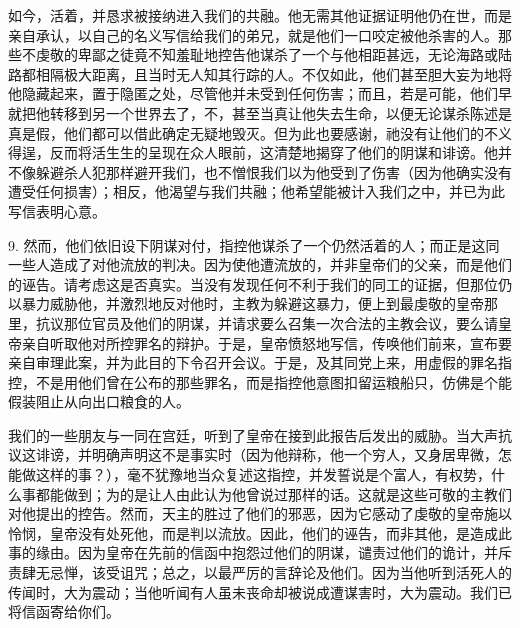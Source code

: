 如今，活着，并恳求被接纳进入我们的共融。他无需其他证据证明他仍在世，而是亲自承认，以自己的名义写信给我们的弟兄，就是他们一口咬定被他杀害的人。那些不虔敬的卑鄙之徒竟不知羞耻地控告他谋杀了一个与他相距甚远，无论海路或陆路都相隔极大距离，且当时无人知其行踪的人。不仅如此，他们甚至胆大妄为地将他隐藏起来，置于隐匿之处，尽管他并未受到任何伤害；而且，若是可能，他们早就把他转移到另一个世界去了，不，甚至当真让他失去生命，以便无论谋杀陈述是真是假，他们都可以借此确定无疑地毁灭。但为此也要感谢，祂没有让他们的不义得逞，反而将活生生的呈现在众人眼前，这清楚地揭穿了他们的阴谋和诽谤。他并不像躲避杀人犯那样避开我们，也不憎恨我们以为他受到了伤害（因为他确实没有遭受任何损害）；相反，他渴望与我们共融；他希望能被计入我们之中，并已为此写信表明心意。\par

9. 然而，他们依旧设下阴谋对付，指控他谋杀了一个仍然活着的人；而正是这同一些人造成了对他流放的判决。因为使他遭流放的，并非皇帝们的父亲，而是他们的诬告。请考虑这是否真实。当没有发现任何不利于我们的同工的证据，但那位仍以暴力威胁他，并激烈地反对他时，主教为躲避这暴力，便上到最虔敬的皇帝那里，抗议那位官员及他们的阴谋，并请求要么召集一次合法的主教会议，要么请皇帝亲自听取他对所控罪名的辩护。于是，皇帝愤怒地写信，传唤他们前来，宣布要亲自审理此案，并为此目的下令召开会议。于是，及其同党上来，用虚假的罪名指控，不是用他们曾在公布的那些罪名，而是指控他意图扣留运粮船只，仿佛是个能假装阻止从向出口粮食的人。\par

我们的一些朋友与一同在宫廷，听到了皇帝在接到此报告后发出的威胁。当大声抗议这诽谤，并明确声明这不是事实时（因为他辩称，他一个穷人，又身居卑微，怎能做这样的事？），毫不犹豫地当众复述这指控，并发誓说是个富人，有权势，什么事都能做到；为的是让人由此认为他曾说过那样的话。这就是这些可敬的主教们对他提出的控告。然而，天主的胜过了他们的邪恶，因为它感动了虔敬的皇帝施以怜悯，皇帝没有处死他，而是判以流放。因此，他们的诬告，而非其他，是造成此事的缘由。因为皇帝在先前的信函中抱怨过他们的阴谋，谴责过他们的诡计，并斥责肆无忌惮，该受诅咒；总之，以最严厉的言辞论及他们。因为当他听到活死人的传闻时，大为震动；当他听闻有人虽未丧命却被说成遭谋害时，大为震动。我们已将信函寄给你们。\par

